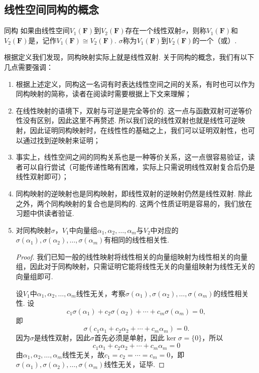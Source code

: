 \subsection{线性空间同构的概念}

\begin{definition}{同构}{} 
    如果由线性空间$V_1(\mathbf{F})$到$V_2(\mathbf{F})$存在一个线性双射$\sigma$，则称$V_1(\mathbf{F})$和$V_2(\mathbf{F})$是，记作$V_1(\mathbf{F}) \cong V_2(\mathbf{F})$. $\sigma$称为$V_1(\mathbf{F})$到$V_2(\mathbf{F})$的一个（或）.
\end{definition}

根据定义我们发现，同构映射实际上就是线性双射. 关于同构的概念，我们有以下几点需要强调：
\begin{enumerate}
    \item 根据上述定义，同构这一名词有时表达线性空间之间的关系，有时也可以作为同构映射的简称，读者在阅读时需要根据上下文来理解；

    \item 在线性映射的语境下，双射与可逆是完全等价的. 这一点与函数双射可逆等价性没有区别，因此这里不再赘述. 所以我们说的线性双射也就是线性可逆映射，因此证明同构映射时，在线性性的基础之上，我们可以证明双射性，也可以通过找到逆映射来证明；

    \item 事实上，线性空间之间的同构关系也是一种等价关系，这一点很容易验证，读者可以自行尝试（可能传递性略有困难，实际上只需说明线性双射复合后仍是线性双射即可）；

    \item 同构映射的逆映射也是同构映射，即线性双射的逆映射仍然是线性双射. 除此之外，两个同构映射的复合也是同构的. 这两个性质证明是容易的，我们放在习题中供读者验证.

    \item 对同构映射$\sigma$，$V_1$中向量组$ \alpha_1,\alpha_2,\ldots,\alpha_m $与$V_2$中对应的$ \sigma(\alpha_1),\sigma(\alpha_2),\ldots,\sigma(\alpha_m) $有相同的线性相关性.

          \begin{proof}
              我们已知一般的线性映射将线性相关的向量组映射为线性相关的向量组，因此对于同构映射，只需证明它能将线性无关的向量组映射为线性无关的向量组即可.

              设$V_1$中$\alpha_1,\alpha_2,\ldots,\alpha_m$线性无关，考察$\sigma(\alpha_1),\sigma(\alpha_2),\ldots,\sigma(\alpha_m)$的线性相关性. 设
              \[c_1\sigma(\alpha_1)+c_2\sigma(\alpha_2)+\cdots+c_m\sigma(\alpha_m)=0,\]
              即
              \[\sigma(c_1\alpha_1+c_2\alpha_2+\cdots+c_m\alpha_m)=0.\]
              因为$\sigma$是线性双射，因此$\sigma$首先必须是单射，因此$\ker\sigma=\{0\}$，所以
              \[c_1\alpha_1+c_2\alpha_2+\cdots+c_m\alpha_m=0\]
              由$\alpha_1,\alpha_2,\ldots,\alpha_m$线性无关，故$c_1=c_2=\cdots=c_m=0$，即$\sigma(\alpha_1),\sigma(\alpha_2),\ldots,\sigma(\alpha_m)$线性无关，证毕.
          \end{proof}


\end{enumerate}
